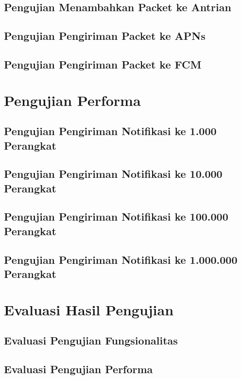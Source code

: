 \subsection{Pengujian Menambahkan Packet ke Antrian}

\subsection{Pengujian Pengiriman Packet ke APNs}

\subsection{Pengujian Pengiriman Packet ke FCM}

\section{Pengujian Performa}

\subsection{Pengujian Pengiriman Notifikasi ke 1.000 Perangkat}

\subsection{Pengujian Pengiriman Notifikasi ke 10.000 Perangkat}

\subsection{Pengujian Pengiriman Notifikasi ke 100.000 Perangkat}

\subsection{Pengujian Pengiriman Notifikasi ke 1.000.000 Perangkat}

\section{Evaluasi Hasil Pengujian}

\subsection{Evaluasi Pengujian Fungsionalitas}

\subsection{Evaluasi Pengujian Performa}
